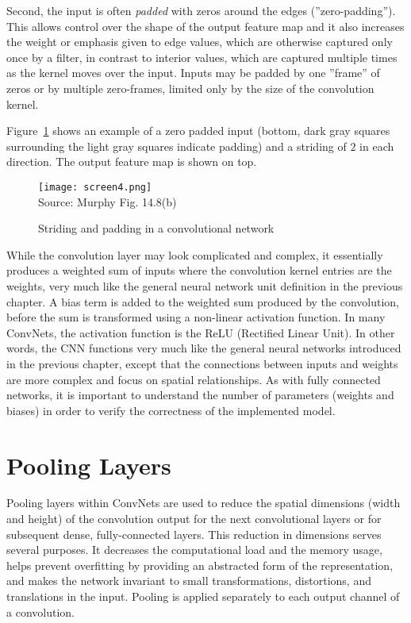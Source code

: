Second, the input is often \emph{padded} with zeros around the edges (''zero-padding''). This allows control over the shape of the output feature map and it also increases the weight or emphasis given to edge values, which are otherwise captured only once by a filter, in contrast to interior values, which are captured multiple times as the kernel moves over the input. Inputs may be padded by one ''frame'' of zeros or by multiple zero-frames, limited only by the size of the convolution kernel.

Figure~\ref{fig:screen4_chap16} shows an example of a zero padded input (bottom, dark gray squares surrounding the light gray squares indicate padding) and a striding of $2$ in each direction. The output feature map is shown on top.  

\begin{figure}
\centering
\texttt{[image: screen4.png]} \\

\scriptsize Source: Murphy Fig. 14.8(b)
\caption{Striding and padding in a convolutional network}
\label{fig:screen4_chap16}
\end{figure}

While the convolution layer may look complicated and complex, it essentially produces a weighted sum of inputs where the convolution kernel entries are the weights, very much like the general neural network unit definition in the previous chapter. A bias term is added to the weighted sum produced by the convolution, before the sum is transformed using a non-linear activation function. In many ConvNets, the activation function is the ReLU (Rectified Linear Unit). In other words, the CNN functions very much like the general neural networks introduced in the previous chapter, except that the connections between inputs and weights are more complex and focus on spatial relationships. As with fully connected networks, it is important to understand the number of parameters (weights and biases) in order to verify the correctness of the implemented model.

\section{Pooling Layers}

Pooling layers within ConvNets are used to reduce the spatial dimensions (width and height) of the convolution output for the next convolutional layers or for subsequent dense, fully-connected layers. This reduction in dimensions serves several purposes. It decreases the computational load and the memory usage, helps prevent overfitting by providing an abstracted form of the representation, and makes the network invariant to small transformations, distortions, and translations in the input. Pooling is applied separately to each output channel of a convolution.

